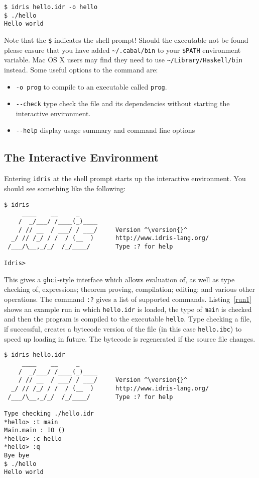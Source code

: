 \begin{lstlisting}[style=stdout]
$ idris hello.idr -o hello
$ ./hello
Hello world
\end{lstlisting}

\noindent
Note that the \texttt{\$} indicates the shell prompt!
Should the \Idris{} executable not be found please ensure that you have added \verb!~/.cabal/bin! to your \verb!$PATH! environment variable.
Mac OS X users may find they need to use \verb!~/Library/Haskell/bin! instead.
Some useful options to the \Idris{} command are:

\begin{itemize}
\item \verb!-o prog! to compile to an executable called \texttt{prog}.
\item \verb!--check! type check the file and its dependencies without starting the
interactive environment.
\item \verb!--help! display usage summary and command line options
\end{itemize}

\subsection{The Interactive Environment}

Entering \texttt{idris} at the shell prompt starts up the interactive environment.
You should see something like the following:

\begin{lstlisting}[style=stdout]
$ idris
     ____    __     _
    /  _/___/ /____(_)____
    / // __  / ___/ / ___/     Version ^\version{}^
  _/ // /_/ / /  / (__  )      http://www.idris-lang.org/
 /___/\__,_/_/  /_/____/       Type :? for help

Idris>
\end{lstlisting}

\noindent
This gives a \texttt{ghci}-style interface which allows evaluation of, as well as type checking of, expressions; theorem proving, compilation; editing; and various other operations.
The command \texttt{:?} gives a list of supported commands.
Listing~\ref{run1} shows an example run in which \texttt{hello.idr} is loaded, the type of \texttt{main} is checked and then the program is compiled to the executable \texttt{hello}.
Type checking a file, if successful, creates a bytecode version of the file (in this case \texttt{hello.ibc}) to speed up loading in future.
The bytecode is regenerated if the source file changes.

\begin{lstlisting}[caption={Sample Interactive Run}, label=run1, style=stdout, float=htp]
$ idris hello.idr
     ____    __     _
    /  _/___/ /____(_)____
    / // __  / ___/ / ___/     Version ^\version{}^
  _/ // /_/ / /  / (__  )      http://www.idris-lang.org/
 /___/\__,_/_/  /_/____/       Type :? for help

Type checking ./hello.idr
*hello> :t main
Main.main : IO ()
*hello> :c hello
*hello> :q
Bye bye
$ ./hello
Hello world
\end{lstlisting}

